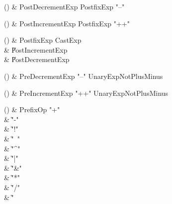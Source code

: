 \begin{bbgrammarappendix}{3.4in}

() & PostDecrementExp \label{prod:PostDecrementExp}  \: PostfixExp \xcd"--"  \\


\end{bbgrammarappendix}

\begin{bbgrammarappendix}{3.4in}

() & PostIncrementExp \label{prod:PostIncrementExp}  \: PostfixExp \xcd"++"  \\


\end{bbgrammarappendix}

\begin{bbgrammarappendix}{4.0in}

() & PostfixExp \label{prod:PostfixExp}  \: CastExp  \\

 &    \| PostIncrementExp \\
 &    \| PostDecrementExp \\

\end{bbgrammarappendix}

\begin{bbgrammarappendix}{3.5in}

() & PreDecrementExp \label{prod:PreDecrementExp}  \: \xcd"--" UnaryExpNotPlusMinus  \\


\end{bbgrammarappendix}

\begin{bbgrammarappendix}{3.5in}

() & PreIncrementExp \label{prod:PreIncrementExp}  \: \xcd"++" UnaryExpNotPlusMinus  \\


\end{bbgrammarappendix}

\begin{bbgrammarappendix}{4.2in}

() & PrefixOp \label{prod:PrefixOp}  \: \xcd"+"  \\

 &    \| \xcd"-" \\
 &    \| \xcd"!" \\
 &    \| \xcd"~" \\
 &    \| \xcd"^" \\
 &    \| \xcd"|" \\
 &    \| \xcd"&" \\
 &    \| \xcd"*" \\
 &    \| \xcd"/" \\
 &    \| \xcd"%

\end{bbgrammarappendix}

